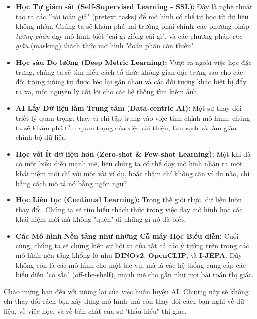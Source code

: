 \begin{itemize}
	\item \textbf{Học Tự giám sát (Self-Supervised Learning - SSL):} Đây là nghệ thuật tạo ra các "bài toán giả" (pretext tasks) để mô hình có thể tự học từ dữ liệu không nhãn. Chúng ta sẽ khám phá hai trường phái chính: các phương pháp \textit{tương phản} dạy mô hình biết "cái gì giống cái gì", và các phương pháp \textit{che giấu} (masking) thách thức mô hình "đoán phần còn thiếu".
	
	\item \textbf{Học sâu Đo lường (Deep Metric Learning):} Vượt ra ngoài việc học đặc trưng, chúng ta sẽ tìm hiểu cách tổ chức không gian đặc trưng sao cho các đối tượng tương tự được kéo lại gần nhau và các đối tượng khác biệt bị đẩy ra xa, một nguyên lý cốt lõi cho các hệ thống tìm kiếm ảnh.
	
	\item \textbf{AI Lấy Dữ liệu làm Trung tâm (Data-centric AI):} Một sự thay đổi triết lý quan trọng: thay vì chỉ tập trung vào việc tinh chỉnh mô hình, chúng ta sẽ khám phá tầm quan trọng của việc cải thiện, làm sạch và làm giàu chính bộ dữ liệu.
	
	\item \textbf{Học với Ít dữ liệu hơn (Zero-shot \& Few-shot Learning):} Một khi đã có một biểu diễn mạnh mẽ, liệu chúng ta có thể dạy mô hình nhận ra một khái niệm mới chỉ với một vài ví dụ, hoặc thậm chí không cần ví dụ nào, chỉ bằng cách mô tả nó bằng ngôn ngữ?
	
	\item \textbf{Học Liên tục (Continual Learning):} Trong thế giới thực, dữ liệu luôn thay đổi. Chúng ta sẽ tìm hiểu thách thức trong việc dạy mô hình học các khái niệm mới mà không "quên" đi những gì nó đã biết.
	
	\item \textbf{Các Mô hình Nền tảng như những Cỗ máy Học Biểu diễn:} Cuối cùng, chúng ta sẽ chứng kiến sự hội tụ của tất cả các ý tưởng trên trong các mô hình nền tảng khổng lồ như \textbf{DINOv2}, \textbf{OpenCLIP}, và \textbf{I-JEPA}. Đây không còn là các mô hình cho một tác vụ, mà là các hệ thống cung cấp các biểu diễn "có sẵn" (off-the-shelf), mạnh mẽ cho gần như mọi bài toán thị giác.
\end{itemize}

Chào mừng bạn đến với tương lai của việc huấn luyện AI. Chương này sẽ không chỉ thay đổi cách bạn xây dựng mô hình, mà còn thay đổi cách bạn nghĩ về dữ liệu, về việc học, và về bản chất của sự "thấu hiểu" thị giác.